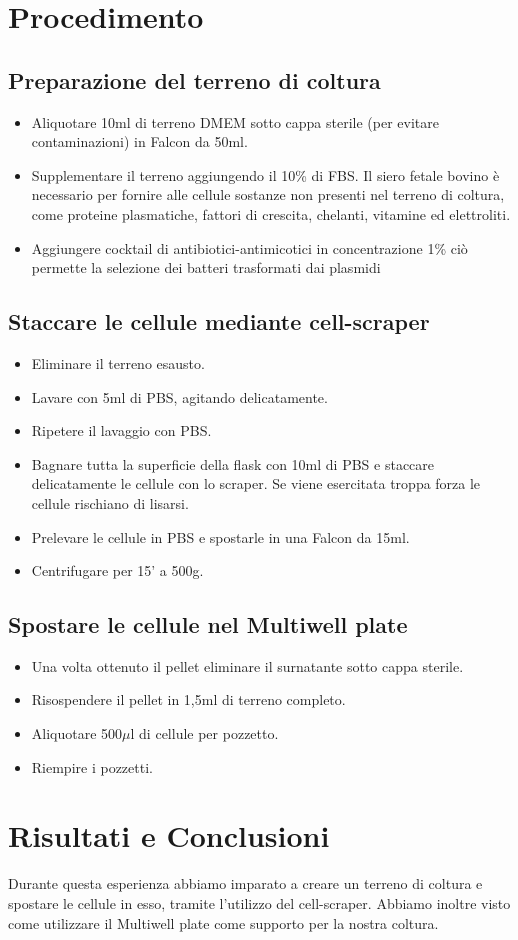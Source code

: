 \section{Procedimento}

\subsection{Preparazione del terreno di coltura}

\begin{itemize}
	\item Aliquotare 10ml di terreno DMEM sotto cappa sterile
	(per evitare contaminazioni) in Falcon da 50ml.
	\item Supplementare il terreno aggiungendo il 10\% di FBS.
	Il siero fetale bovino \`e necessario per fornire alle cellule sostanze non
	presenti nel terreno di coltura, come proteine plasmatiche,
	fattori di crescita, chelanti, vitamine ed elettroliti.
	\item Aggiungere cocktail di antibiotici-antimicotici in concentrazione 1\%
	ci\`o permette la selezione dei batteri trasformati dai plasmidi
\end{itemize}

\subsection{Staccare le cellule mediante cell-scraper}
\begin{itemize}
	\item Eliminare il terreno esausto.
	\item Lavare con 5ml di PBS, agitando delicatamente.
	\item Ripetere il lavaggio con PBS.
	\item Bagnare tutta la superficie della flask con 10ml di PBS e staccare
	delicatamente le cellule con lo scraper. Se viene esercitata troppa forza le
	cellule rischiano di lisarsi.
	\item Prelevare le cellule in PBS e spostarle in una Falcon da 15ml.
	\item Centrifugare per 15' a 500g.
\end{itemize}

\subsection{Spostare le cellule nel Multiwell plate}
\begin{itemize}
	\item Una volta ottenuto il pellet eliminare il surnatante sotto cappa sterile.
	\item Risospendere il pellet in 1,5ml di terreno completo.
	\item Aliquotare 500$\mu$l di cellule per pozzetto.
	\item Riempire i pozzetti.
\end{itemize}

\section{Risultati e Conclusioni}

Durante questa esperienza abbiamo imparato a creare un terreno di coltura
e spostare le cellule in esso, tramite l'utilizzo del cell-scraper.
Abbiamo inoltre visto come utilizzare il Multiwell plate come supporto per la
nostra coltura.
